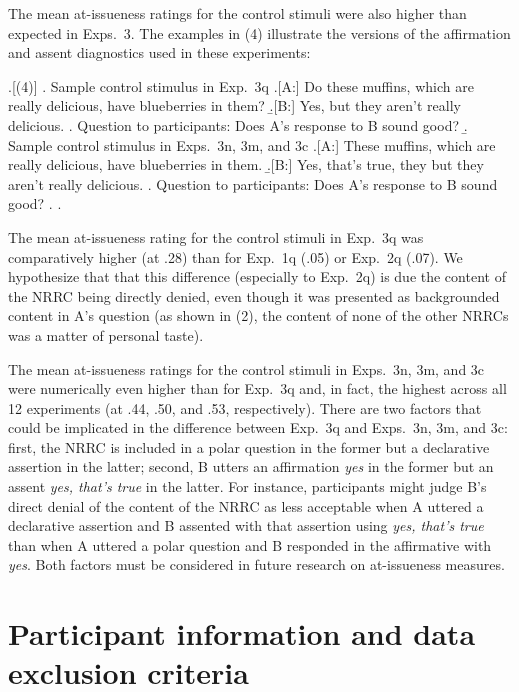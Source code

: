\documentclass[a4paper,12pt,twoside]{article}
\begin{document}
    The mean at-issueness ratings for the control stimuli were also higher than expected in Exps.~3. The examples in (4) illustrate the versions of the affirmation and assent diagnostics used in these experiments:

    \ex.[(4)]
        \a. Sample control stimulus in Exp.~3q
            \a.[A:] Do these muffins, which are really delicious, have blueberries in them?
            \b.[B:] Yes, but they aren't really delicious.
            \z.
        Question to participants: Does A's response to B sound good?
        \b. Sample control stimulus in Exps.~3n, 3m, and 3c
            \a.[A:] These muffins, which are really delicious, have blueberries in them.
            \b.[B:] Yes, that's true, they but they aren't really delicious.
            \z.
        Question to participants: Does A's response to B sound good?
        \z.
    \z.

    The mean at-issueness rating for the control stimuli in Exp.~3q was comparatively higher (at .28) than for Exp.~1q (.05) or Exp.~2q (.07). We hypothesize that that this difference (especially to Exp.~2q) is due the content of the NRRC being directly denied, even though it was presented as backgrounded content in A's question (as shown in (2), the content of none of the other NRRCs was a matter of personal taste).

    The mean at-issueness ratings for the control stimuli in Exps.~3n, 3m, and 3c were numerically even higher than for Exp.~3q and, in fact, the highest across all 12 experiments (at .44, .50, and .53, respectively). There are two factors that could be implicated in the difference between Exp.~3q and Exps.~3n, 3m, and 3c: first, the NRRC is included in a polar question in the former but a declarative assertion in the latter; second, B utters an affirmation {\em yes} in the former but an assent {\em yes, that's true} in the latter. For instance, participants might judge B's direct denial of the content of the NRRC as less acceptable when A uttered a declarative assertion and B assented with that assertion using {\em yes, that's true} than when A uttered a polar question and B responded in the affirmative with {\em yes}. Both factors must be considered in future research on at-issueness measures.

\section{Participant information and data exclusion criteria}\label{app:d-participants}
\end{document}
